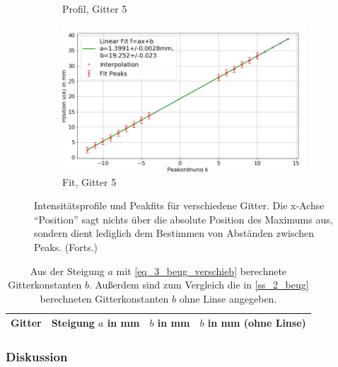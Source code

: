 \documentclass[
	a4paper,
	12pt,
	pagesize,
	ngerman
]{scrartcl}
\begin{document}
\begin{figure}[H]
\begin{subfigure}[b]{0.475\textwidth}
            \caption%
            {Profil, Gitter 5}
            \label{fig_3_profil_g5}
        \end{subfigure}
        \hfill
        \begin{subfigure}[b]{0.475\textwidth}
            \centering
            \includegraphics[width=\textwidth]{img/3/3_trafo_g5_fit}
            \caption[]%
            {Fit, Gitter 5}
            \label{fig_3_fit_g5}
        \end{subfigure}
        \caption%
        {
				Intensitätsprofile und Peakfits für verschiedene Gitter.
				Die x-Achse \enquote{Position} sagt nichts über die absolute Position des Maximums aus, sondern dient lediglich dem Bestimmen von Abständen zwischen Peaks. (Forts.)
				}
        \label{fig_3_mix_2}
    \end{figure}

\begin{table}[H]
		\centering
		\begin{tabular}{ c | c | c | c }
			 Gitter & Steigung $a$ in \si{mm} & $b$ in \si{mm} & $b$ in \si{mm} (ohne Linse)\\ \hline
			 
		\end{tabular}
		\caption{
		Aus der Steigung $a$ mit \cref{eq_3_beug_verschieb} berechnete Gitterkonstanten $b$.
		Außerdem sind zum Vergleich die in \cref{ss_2_beug} berechneten Gitterkonstanten $b$ ohne Linse angegeben.
		}
		\label{tb_3_beug}
\end{table}
	\subsubsection*{Diskussion}
\end{document}
